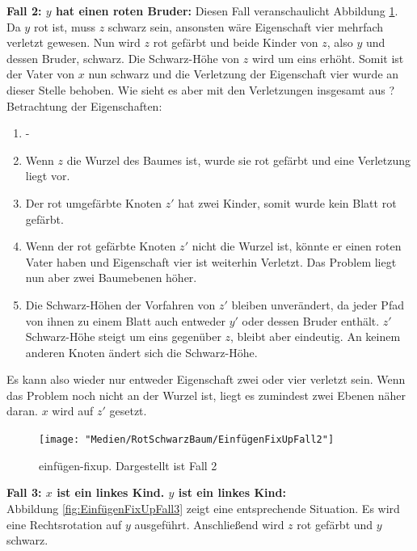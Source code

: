 \documentclass[a4paper,12pt]{article}
\begin{document}
\noindent\textbf{Fall 2: $y$ hat einen roten Bruder: }
\noindent Diesen Fall veranschaulicht Abbildung \ref{fig:EinfügenFixUpFall2}. Da $y$ rot ist, muss $z$ schwarz sein, ansonsten wäre Eigenschaft vier mehrfach verletzt gewesen. Nun wird $z$ rot gefärbt und beide Kinder von $z$, also $y$ und dessen Bruder, schwarz. Die Schwarz-Höhe von $z$ wird um eins erhöht. Somit ist der Vater von $x$ nun schwarz und die Verletzung der Eigenschaft vier wurde an dieser Stelle behoben. Wie sieht es aber mit den Verletzungen insgesamt aus ? \\

Betrachtung der Eigenschaften:

\begin{enumerate}
	\item -
	\item Wenn $z$ die Wurzel des Baumes ist, wurde sie rot gefärbt und eine Verletzung liegt vor.
	\item Der rot umgefärbte Knoten $z'$ hat zwei Kinder, somit wurde kein Blatt rot gefärbt.
	\item  Wenn der rot gefärbte Knoten $z'$ nicht die Wurzel ist, könnte er einen roten Vater haben und Eigenschaft vier ist weiterhin Verletzt. Das Problem liegt nun aber zwei Baumebenen höher.
	\item  Die Schwarz-Höhen der Vorfahren von $z'$ bleiben unverändert, da jeder Pfad von ihnen zu einem Blatt auch entweder $y'$ oder dessen Bruder enthält. $z'$ Schwarz-Höhe steigt um eins gegenüber $z$, bleibt aber eindeutig. An keinem anderen Knoten ändert sich die Schwarz-Höhe. 

\end{enumerate} 
Es kann also wieder nur entweder Eigenschaft zwei oder vier verletzt sein. Wenn das Problem noch nicht an der Wurzel ist, liegt es zumindest zwei Ebenen näher daran. $x$ wird auf $z'$ gesetzt. 
\begin{figure}[h]
	\centering
	\texttt{[image: "Medien/RotSchwarzBaum/EinfügenFixUpFall2"]}
	\caption{einfügen-fixup. Dargestellt ist Fall 2  }
	\label{fig:EinfügenFixUpFall2}
\end{figure}

\noindent\textbf{Fall 3: $x$ ist ein linkes Kind. $y$ ist ein linkes Kind: }\\
\noindent Abbildung \ref{fig:EinfügenFixUpFall3} zeigt eine entsprechende Situation. Es wird eine Rechtsrotation auf $y$ ausgeführt. Anschließend wird $z$ rot gefärbt und $y$ schwarz. \\
\end{document}
